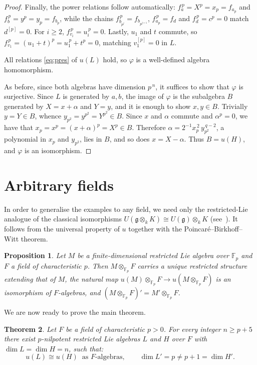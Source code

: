\documentclass[11pt,reqno]{amsart}
\theoremstyle{plain}
\newtheorem{theorem}{Theorem}[section]
\newtheorem{proposition}[theorem]{Proposition}
\theoremstyle{remark}
\newcommand{\Fp}{\mathbb{F}_p}
\begin{document}
\begin{proof}
Finally, the power relations follow automatically: $f_a^{\,p}=X^p=x_p=f_{a_p}$ and
$f_b^{\,p}=y^p=y_p=f_{b_p}$, while the chains
$f_{b_{p^j}}^{\,p}=f_{b_{p^{j+1}}}$, $f_{a_p}^{\,p}=f_d$ and
$f_d^{\,p}=c^p=0$ match
$d^{[p]}=0$. For $i\ge2$, $f_{v_i}^{\,p}=u_i^{\,p}=0$. Lastly, $u_1$ and $t$
commute, so $f_{v_1}^{\,p}=(u_1+t)^p=u_1^{\,p}+t^p=0$, matching $v_1^{[p]}=0$ in $L$.

All relations \eqref{eq:pres} of $u(L)$ hold, so $\varphi$ is a well-defined
algebra homomorphism.

As before, since both algebras have dimension $p^{\,n}$, it suffices to show that $\varphi$ is surjective. 
Since $L$ is generated by $a,b$,
the image of $\varphi$ is the subalgebra $B$ generated by $X=x+\alpha$ and
$Y=y$, and it is enough to show $x,y\in B$. Trivially $y=Y\in B$, whence
$y_{p^2}=y^{p^2}=Y^{p^2}\in B$. Since $x$ and $\alpha$ commute and
$\alpha^p=0$, we have that 
$x_p=x^p=(x+\alpha)^p=X^p\in B$. Therefore
$\alpha=2^{-1}x_p^{\,2}\,y_{p^2}^{\,q-2}$, a polynomial in $x_p$ and
$y_{p^2}$, lies in $B$, and so does $x=X-\alpha$. Thus $B=u(H)$, and
$\varphi$ is an isomorphism.
\end{proof}

\section{Arbitrary fields}\label{sec:fields}

In order to generalise the examples to any field, we need only the restricted-Lie analogue of the classical
isomorphisms $U(\mathfrak g\otimes_kK)\cong U(\mathfrak g)\otimes_kK$
(see~\cite{SF}). It follows from the universal
property of $u$ together with the Poincar\'e--Birkhoff--Witt theorem.

\begin{proposition}\label{prop:base}
Let $M$ be a finite-dimensional restricted Lie algebra over $\Fp$ and $F$ a
field of characteristic $p$. Then $M\otimes_{\Fp}F$ carries a unique
restricted structure extending that of $M$, the natural map
$u(M)\otimes_{\Fp}F\to u(M\otimes_{\Fp}F)$ is an isomorphism of $F$-algebras,
and $(M\otimes_{\Fp}F)'=M'\otimes_{\Fp}F$.
\end{proposition}

We are now ready to prove the main theorem.
\begin{theorem}\label{thm:final}
Let $F$ be a field of characteristic $p>0$. For every integer $n\ge p+5$
there exist $p$-nilpotent restricted Lie algebras $L$ and $H$ over $F$ with
$\dim L=\dim H=n$, such that:
\[
u(L)\cong u(H)\ \text{ as $F$-algebras},\qquad
\dim L'=p\neq p+1=\dim H' .
\]
\end{theorem}
\end{document}
